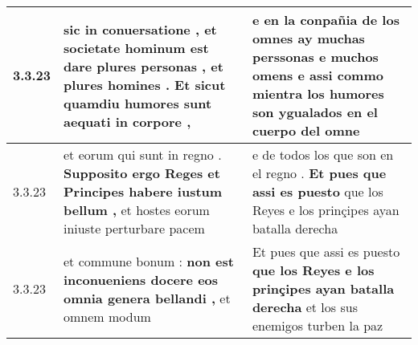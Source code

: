 \begin{tabular}{|p{1cm}|p{6.5cm}|p{6.5cm}|}
3.3.23 & sic in conuersatione , et societate hominum est \textbf{ dare plures personas , et plures homines . } Et sicut quamdiu humores sunt aequati in corpore , & e en la conpañia de los omnes \textbf{ ay muchas perssonas e muchos omens } e assi commo mientra los humores son ygualados en el cuerpo del omne \\\hline
3.3.23 & et eorum qui sunt in regno . \textbf{ Supposito ergo Reges et Principes habere iustum bellum , } et hostes eorum iniuste perturbare pacem & e de todos los que son en el regno . \textbf{ Et pues que assi es puesto } que los Reyes e los prinçipes ayan batalla derecha \\\hline
3.3.23 & et commune bonum : \textbf{ non est inconueniens docere eos omnia genera bellandi , } et omnem modum & Et pues que assi es puesto \textbf{ que los Reyes e los prinçipes ayan batalla derecha } et los sus enemigos turben la paz \\\hline

\end{tabular}
